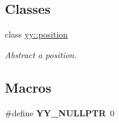 \subsection*{Classes}
\begin{DoxyCompactItemize}
\item 
class \hyperlink{classyy_1_1position}{yy\+::position}
\begin{DoxyCompactList}\small\item\em Abstract a position. \end{DoxyCompactList}\end{DoxyCompactItemize}
\subsection*{Macros}
\begin{DoxyCompactItemize}
\item 
\#define {\bfseries Y\+Y\+\_\+\+N\+U\+L\+L\+P\+TR}~0\hypertarget{position_8hh_a5a6c82f7ce4ad9cc8c6c08b7a2de5b84}{}\label{position_8hh_a5a6c82f7ce4ad9cc8c6c08b7a2de5b84}

\end{DoxyCompactItemize}

